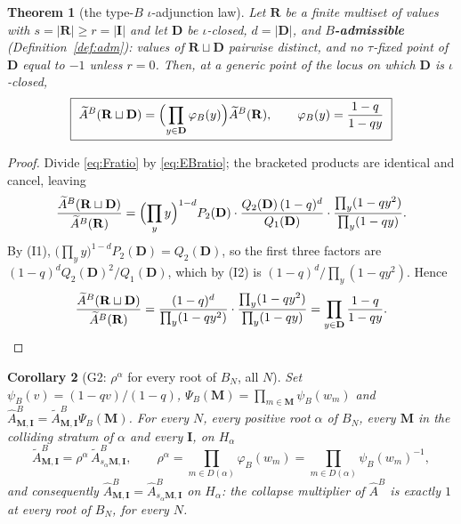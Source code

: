 \documentclass[11pt]{article}
\newtheorem{thm}{Theorem}
\newtheorem{cor}[thm]{Corollary}
\theoremstyle{definition}
\newcommand{\At}{\widetilde{A}}
\newcommand{\Ah}{\widehat{A}}
\newcommand{\bM}{\mathbf{M}}
\newcommand{\bI}{\mathbf{I}}
\newcommand{\bD}{\mathbf{D}}
\newcommand{\bR}{\mathbf{R}}
\begin{document}
\begin{thm}[the type-$B$ $\iota$-adjunction law]\label{thm:gaugeB}
Let $\bR$ be a finite multiset of values with $s=|\bR|\ge r=|\bI|$ and let
$\bD$ be $\iota$-closed, $d=|\bD|$, and \textbf{$B$-admissible}
(Definition~\ref{def:adm}): values of $\bR\sqcup\bD$ pairwise distinct, and no
$\tau$-fixed point of $\bD$ equal to $-1$ unless $r=0$.  Then, at a generic
point of the locus on which $\bD$ is $\iota$-closed,
\[
  \boxed{\ \At^{B}(\bR\sqcup\bD)=\Bigl(\prod_{y\in\bD}\varphi_B(y)\Bigr)\At^{B}(\bR),
  \qquad \varphi_B(y)=\frac{1-q}{1-qy}\ }
\]
\end{thm}

\begin{proof}
Divide \eqref{eq:Fratio} by \eqref{eq:EBratio}; the bracketed products are
identical and cancel, leaving
\[
  \frac{\At^{B}(\bR\sqcup\bD)}{\At^{B}(\bR)}
  =\Bigl(\prod_{y}y\Bigr)^{1-d}P_2(\bD)\cdot
   \frac{Q_2(\bD)\,(1-q)^{d}}{Q_1(\bD)}\cdot
   \frac{\prod_{y}(1-qy^{2})}{\prod_{y}(1-qy)} .
\]
By (I1), $\bigl(\prod_y y\bigr)^{1-d}P_2(\bD)=Q_2(\bD)$, so the first three
factors are $(1-q)^{d}Q_2(\bD)^{2}/Q_1(\bD)$, which by (I2) is
$(1-q)^{d}\big/\prod_{y}(1-qy^{2})$.  Hence
\[
  \frac{\At^{B}(\bR\sqcup\bD)}{\At^{B}(\bR)}
  =\frac{(1-q)^{d}}{\prod_{y}(1-qy^{2})}\cdot
   \frac{\prod_{y}(1-qy^{2})}{\prod_{y}(1-qy)}
  =\prod_{y\in\bD}\frac{1-q}{1-qy}. \qedhere
\]
\end{proof}

\begin{cor}[G2: $\rho^{\alpha}$ for every root of $B_N$, all $N$]\label{cor:rhoB}
Set $\psi_B(v)=(1-qv)/(1-q)$, $\Psi_B(\bM)=\prod_{m\in\bM}\psi_B(w_m)$ and
$\Ah^{B}_{\bM,\bI}=\At^{B}_{\bM,\bI}\Psi_B(\bM)$.  For every $N$, every positive
root $\alpha$ of $B_N$, every $\bM$ in the colliding stratum of $\alpha$ and
every $\bI$, on $H_\alpha$
\[
   \At^{B}_{\bM,\bI}=\rho^{\alpha}\,\At^{B}_{s_\alpha\bM,\bI},
   \qquad
   \rho^{\alpha}=\prod_{m\in D(\alpha)}\varphi_B(w_m)
                =\prod_{m\in D(\alpha)}\psi_B(w_m)^{-1},
\]
and consequently $\Ah^{B}_{\bM,\bI}=\Ah^{B}_{s_\alpha\bM,\bI}$ on $H_\alpha$:
the collapse multiplier of $\Ah^{B}$ is exactly $1$ at every root of $B_N$, for
every $N$.
\end{cor}
\end{document}
